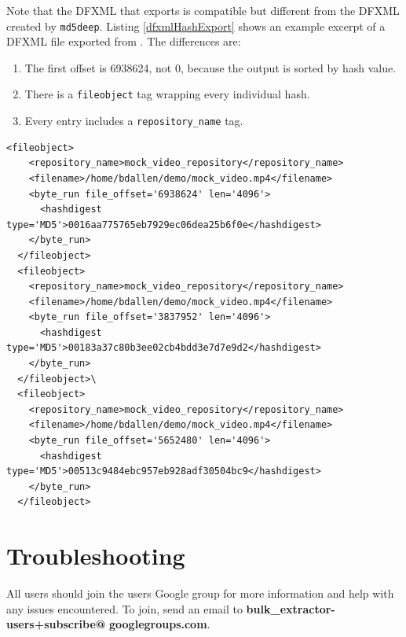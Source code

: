 \documentclass[11pt,fleqn]{article} %
\begin{document}
Note that the DFXML that \hash exports is compatible but different from the DFXML created by \texttt{md5deep}. Listing \ref{dfxmlHashExport} shows an example excerpt of a DFXML file exported from \hash. The differences are:
\begin{enumerate}
\item The first offset is 6938624, not 0,
because the output is sorted by hash value. 
\item There is a \texttt{fileobject} tag wrapping every individual hash.
\item Every entry includes a \texttt{repository\_name} tag.
\end{enumerate}

\lstset{style=customfile}
\begin{lstlisting}[float, caption=Excerpt of a DFXML exported by \hash, label=dfxmlHashExport]
  <fileobject>
    <repository_name>mock_video_repository</repository_name>
    <filename>/home/bdallen/demo/mock_video.mp4</filename>
    <byte_run file_offset='6938624' len='4096'>
      <hashdigest type='MD5'>0016aa775765eb7929ec06dea25b6f0e</hashdigest>
    </byte_run>
  </fileobject>
  <fileobject>
    <repository_name>mock_video_repository</repository_name>
    <filename>/home/bdallen/demo/mock_video.mp4</filename>
    <byte_run file_offset='3837952' len='4096'>
      <hashdigest type='MD5'>00183a37c80b3ee02cb4bdd3e7d7e9d2</hashdigest>
    </byte_run>
  </fileobject>\
  <fileobject>
    <repository_name>mock_video_repository</repository_name>
    <filename>/home/bdallen/demo/mock_video.mp4</filename>
    <byte_run file_offset='5652480' len='4096'>
      <hashdigest type='MD5'>00513c9484ebc957eb928adf30504bc9</hashdigest>
    </byte_run>
  </fileobject>
\end{lstlisting}




\section{Troubleshooting}
\label{DebuggingHashdb}
All \hash users should join the \bulk users Google group for more information and help with any issues encountered. To join, send an email to \textbf{bulk\_extractor-users+subscribe@} \textbf{googlegroups.com}.  \\
\end{document}
